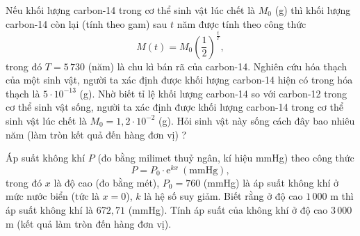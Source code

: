 \begin{bt}%
Nếu khối lượng carbon-14 trong cơ thể sinh vật lúc chết là $M_0$ (g) thì khối lượng carbon-14 còn lại (tính theo gam) sau $t$ năm được tính theo công thức
\[M(t)=M_0\left(\dfrac{1}{2}\right)^{\tfrac{t}{T}},
\]
trong đó $T=5\,730$ (năm) là chu kì bán rã của carbon-14. Nghiên cứu hóa thạch của một sinh vật, người ta xác định được khối lượng carbon-14 hiện có trong hóa thạch là $5\cdot 10^{-13}$ (g).
Nhờ biết tỉ lệ khối lượng carbon-14 so với carbon-12 trong cơ thể sinh vật sống, người ta xác định được khối lượng carbon-14 trong cơ thể sinh vật lúc chết là $M_0=1{,}2\cdot 10^{-2}$ (g). Hỏi sinh vật này sống cách đây bao nhiêu năm (làm tròn kết quả đến hàng đơn vị) ?
\par
{}
\end{bt}

\begin{bt}%
Áp suất không khí $P$ (đo bằng milimet thuỷ ngân, kí hiệu mmHg) theo công thức
\[P=P_0\cdot \mathrm{e}^{kx}\ (\text{mmHg}),
\]
trong đó $x$ là độ cao (đo bằng mét), $P_0=760$ (mmHg) là áp suất không khí ở mức nước biển (tức là $x=0$), $k$ là hệ số suy giảm. Biết rằng ở độ cao $1\,000$ m thì áp suất không khí là $672{,}71$ (mmHg). Tính áp suất của không khí ở độ cao $3\,000$ m (kết quả làm tròn đến hàng đơn vị).
\end{bt}

